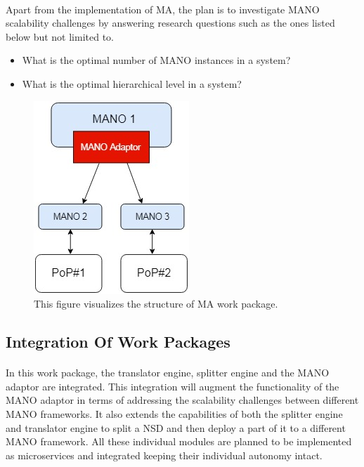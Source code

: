 \paragraph{}
Apart from the implementation of MA, the plan is to investigate MANO scalability challenges by answering research questions such as the ones listed below but not limited to.
\begin{itemize}
	\item What is the optimal number of MANO instances in a system?
	\item What is the optimal hierarchical level in a system?
\end{itemize}

\begin{figure}[h]
	\centering
	\includegraphics[width=0.29\linewidth]{figures/Structure2}
	\caption{This figure visualizes the structure of MA work package. }
	\label{fig:structure2}
\end{figure}

\subsection{Integration Of Work Packages}
\paragraph{}

In this work package, the translator engine, splitter engine and the MANO adaptor are integrated. This integration will augment the functionality of the MANO adaptor in terms of addressing the scalability challenges between different MANO frameworks. It also extends the capabilities of both the splitter engine and translator engine to split a NSD and then deploy a part of it to a different MANO framework. All these individual modules are planned to be implemented as microservices and integrated keeping their individual autonomy intact. 

